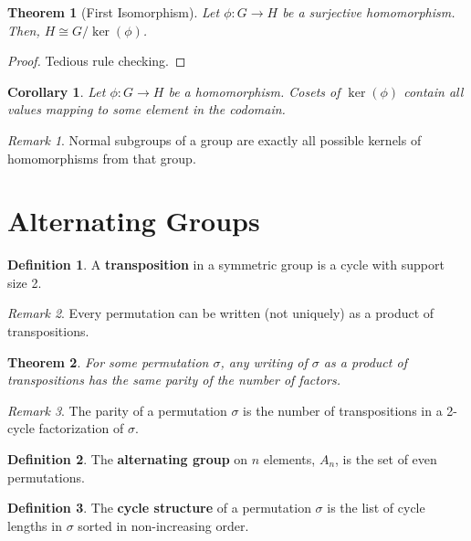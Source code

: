 \documentclass[
    parskip=half,
    toc=flat,
    toc=sectionentrydotfill,
]{scrartcl}  %
\theoremstyle{definition}
\newtheorem{definition}{Definition}[section]
\theoremstyle{plain}
\newtheorem{theorem}{Theorem}[section]
\newtheorem{corollary}{Corollary}[theorem]
\theoremstyle{remark}
\newtheorem{remark}{Remark}[section]
\begin{document}
\begin{theorem}[First Isomorphism]
    Let $\phi:G\to H$ be a surjective homomorphism.
    Then, $H\cong G/\ker(\phi)$.
\end{theorem}

\begin{proof}
    Tedious rule checking.
\end{proof}

\begin{corollary}
    Let $\phi:G\to H$ be a homomorphism.
    Cosets of $\ker(\phi)$ contain all values mapping to some element in the codomain.
\end{corollary}

\begin{remark}
    Normal subgroups of a group are exactly all possible kernels of homomorphisms from that group.
\end{remark}


\section{Alternating Groups}


\begin{definition}
    A \textbf{transposition} in a symmetric group is a cycle with support size 2.
\end{definition}

\begin{remark}
    Every permutation can be written (not uniquely) as a product of transpositions.
\end{remark}

\begin{theorem}
    For some permutation $\sigma$, any writing of $\sigma$ as a product of transpositions has the
    same parity of the number of factors.
\end{theorem}


\begin{remark}
    The parity of a permutation $\sigma$ is the number of transpositions in a 2-cycle factorization
    of $\sigma$.
\end{remark}

\begin{definition}
    The \textbf{alternating group} on $n$ elements, $A_n$, is the set of even permutations.
\end{definition}

\begin{definition}
    The \textbf{cycle structure} of a permutation $\sigma$ is the list of cycle lengths in $\sigma$
    sorted in non-increasing order.
\end{definition}
\end{document}
